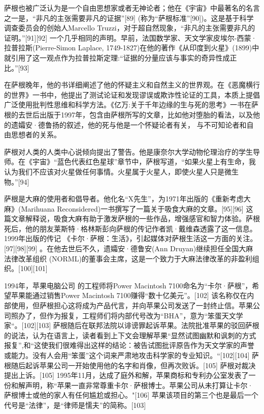萨根也被广泛认为是一个自由思想家或者无神论者；他在《宇宙》中最著名的名言之一是，“非凡的主张需要非凡的证据”[89] (称为“萨根标准”[90])。这是基于科学调查委员会的创始人Marcello Truzzi，对于超自然现象，“非凡的主张需要非凡的证明。”[91][92] 一个几乎相同的声明。早前，法国数学家、天文学家皮埃尔-西蒙·拉普拉斯(Pierre-Simon Laplace, 1749-1827)在他的著作《从印度到火星》(1899)中就引用了这一观点作为拉普拉斯定理:“证据的分量应该与事实的奇异性成正比。”[93]

在萨根晚年，他的书详细阐述了他的怀疑主义和自然主义的世界观。在《恶魔横行的世界》一书中，他提出了测试论证和发现谬误或欺诈性论证的工具，本质上提倡广泛使用批判性思维和科学方法。《亿万:关于千年边缘的生与死的思考》一书在萨根的去世后出版于1997年，包含由萨根所写的文章，比如他对堕胎的看法，以及他的遗孀安·德鲁扬的叙述，他的死与他是一个怀疑论者有关， 与不可知论者和自由思想者的关系。

萨根对人类的人类中心说倾向提出了警告。他是康奈尔大学动物伦理治疗的学生导师。在《宇宙》“蓝色代表红色星球”章节中，萨根写道，“如果火星上有生命，我认为我们不应该对火星做任何事情。火星属于火星人，即使火星人只是微生物。”[94]

萨根是大麻的使用者和倡导者。他化名“X先生”，为1971年出版的《重新考虑大麻》(Marihuana Reconsidered)一书撰写了一篇关于吸食大麻的文章。[95][96] 这篇文章解释说，吸食大麻有助于激发萨根的一些作品，增强感官和智力体验。萨根死后，他的朋友莱斯特·格林斯彭向萨根的传记作者凯·戴维森透露了这一信息。1999年出版的传记 《卡尔·萨根：生活》，引起媒体对萨根生活这一方面的关注。[97][98][99] 。在他去世后不久，遗孀安·德鲁安(Ann Druyan)继续担任全国大麻法律改革组织 (NORML)的董事会主席，这是一个致力于大麻法律改革的非盈利组织。[100][101]

1994年，苹果电脑公司 的工程师将Power Macintosh 7100命名为“卡尔·萨根”，希望苹果能通过销售Power Macintosh 7100赚得“数十亿美元”。[102] 该名称仅在内部使用，但萨根担心这将成为产品代言，并向苹果公司发送了一封终止信。苹果公司照办了，但作为报复，工程师们将内部代号改为“BHA”，意为“笨蛋天文学家“。[102][103] 萨根随后在联邦法院以诽谤罪起诉苹果。法院批准苹果的驳回萨根的说法，认为在语言上，读者看到上下文会理解苹果“显然试图幽默和讽刺的方式报复”,和“这使我们很难得出这样的结论：被告试图批评原告作为天文学家的声誉或能力。没有人会用“笨蛋”这个词来严肃地攻击科学家的专业知识。“[102][104] 萨根随后起诉苹果公司一开始使用他的名字和肖像，但再次败诉。[105] 萨根对裁决提出上诉。[105] 1995年11月，达成了庭外和解，苹果商标和专利办公室发表了一份和解声明，称“苹果一直非常尊重卡尔·萨根博士。苹果公司从未打算让卡尔·萨根博士或他的家人有任何尴尬或担心。"[106] 苹果该项目的第三个也是最后一个代号是“法律”，是“律师是懦夫”的简称。[103]

